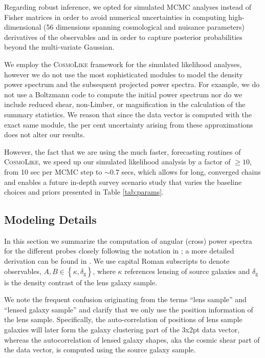 \documentclass[fleqn,usenatbib,useAMS]{mnras}
\newcommand{\CL}{\textsc{CosmoLike}}
\begin{document}
Regarding robust inference, we opted for simulated MCMC analyses instead of Fisher matrices in order to avoid numerical uncertainties in computing high-dimensional (56 dimensions spanning cosmological and nuisance parameters) derivatives of the observables and in order to capture posterior probabilities beyond the multi-variate Gaussian.

We employ the \textsc{CosmoLike} framework \citep{eks14, kre17} for the simulated likelihood analyses, however we do not use the most sophisticated modules to model the density power spectrum and the subsequent projected power spectra. For example, we do not use a Boltzmann code to compute the initial power spectrum nor do we include reduced shear, non-Limber, or magnification in the calculation of the summary statistics. We reason that since the data vector is computed with the exact same module, the per cent uncertainty arising from these approximations does not alter our results. 

However, the fact that we are using the much faster, forecasting routines of \CL, we speed up our simulated likelihood analysis by a factor of $\ge10$, from 10 sec per MCMC step to $\sim 0.7$ secs, which allows for long, converged chains and enables a future in-depth survey scenario study that varies the baseline choices and priors presented in Table \ref{tab:params}.  

\subsection{Modeling Details}
In this section we summarize the computation of angular (cross) power spectra for the different probes closely following the notation in \citep{kre17}; a more detailed derivation can be found in \citet{huj04}. We use capital Roman subscripts to denote observables, $A,B\in \left\{ \kappa,\delta_{\mathrm{g}}\right\}$, where $\kappa$ references lensing of source galaxies and $\delta_{\mathrm{g}}$ is the density contrast of the lens galaxy sample. 

We note the frequent confusion originating from the terms ``lens sample'' and ``lensed galaxy sample'' and clarify that we only use the position information of the lens sample. Specifically, the auto-correlation of positions of lens sample galaxies will later form the galaxy clustering part of the 3x2pt data vector, whereas the autocorrelation of lensed galaxy shapes, aka the cosmic shear part of the data vector, is computed using the source galaxy sample. 
\end{document}
